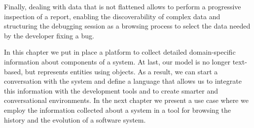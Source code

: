 Finally, dealing with data that is not flattened allows to perform a progressive inspection of a report, enabling the discoverability of complex data and structuring the debugging session as a browsing process to select the data needed by the developer fixing a bug.


In this chapter we put in place a platform to collect detailed domain-specific information about components of a system.
At last, our model is no longer text-based, but represents entities using objects.
As a result, we can start a conversation with the system and define a language that allows us to integrate this information with the development tools and to create smarter and conversational environments.
In the next chapter we present a use case where we employ the information collected about a system in a tool for browsing the history and the evolution of a software system.
